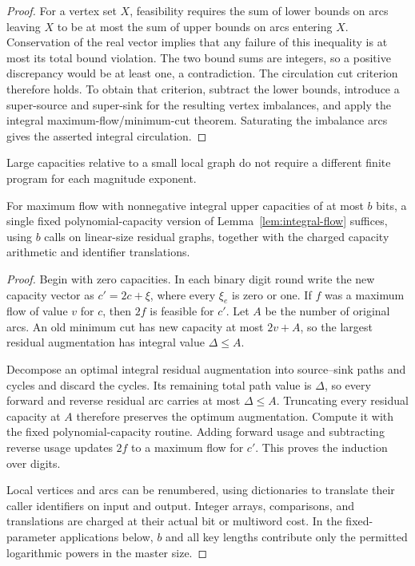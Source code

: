 \begin{proof}
For a vertex set $X$, feasibility requires the sum of lower bounds on arcs
leaving $X$ to be at most the sum of upper bounds on arcs entering $X$.
Conservation of the real vector implies that any failure of this inequality
is at most its total bound violation. The two bound sums are integers, so
a positive discrepancy would be at least one, a contradiction. The
circulation cut criterion therefore holds. To obtain that criterion, subtract
the lower bounds, introduce a super-source and super-sink for the resulting
vertex imbalances, and apply the integral maximum-flow/minimum-cut theorem.
Saturating the imbalance arcs gives the asserted integral circulation.
\end{proof}

Large capacities relative to a small local graph do not require a different
finite program for each magnitude exponent.

\begin{lemma}\label{lem:capacity-scaling}
For maximum flow with nonnegative integral upper capacities of at most $b$
bits, a single fixed polynomial-capacity version of
Lemma~\ref{lem:integral-flow} suffices, using $b$ calls on linear-size
residual graphs, together with the charged capacity arithmetic and identifier
translations.
\end{lemma}

\begin{proof}
Begin with zero capacities. In each binary digit round write the new
capacity vector as $c'=2c+\xi$, where every $\xi_e$ is zero or one.
If $f$ was a maximum flow of value $v$ for $c$, then $2f$ is feasible for
$c'$. Let $A$ be the number of original arcs. An old minimum cut has new
capacity at most $2v+A$, so the largest residual augmentation has integral
value $\Delta\le A$.

Decompose an optimal integral residual augmentation into source--sink paths
and cycles and discard the cycles. Its remaining total path value is
$\Delta$, so every forward and reverse residual arc carries at most
$\Delta\le A$. Truncating every residual capacity at $A$ therefore preserves
the optimum augmentation. Compute it with the fixed polynomial-capacity
routine. Adding forward usage and subtracting reverse usage updates $2f$
to a maximum flow for $c'$. This proves the induction over digits.

Local vertices and arcs can be renumbered, using dictionaries to translate
their caller identifiers on input and output. Integer arrays, comparisons,
and translations are charged at their actual bit or multiword cost.
In the fixed-parameter applications below, $b$ and all key lengths contribute
only the permitted logarithmic powers in the master size.
\end{proof}

